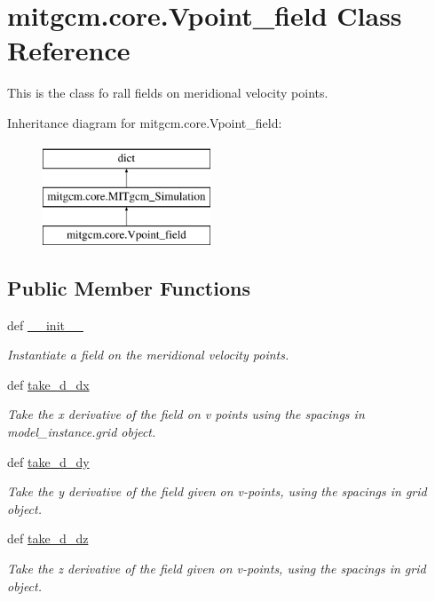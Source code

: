 \hypertarget{classmitgcm_1_1core_1_1Vpoint__field}{\section{mitgcm.\+core.\+Vpoint\+\_\+field Class Reference}
\label{classmitgcm_1_1core_1_1Vpoint__field}
}


This is the class fo rall fields on meridional velocity points.  


Inheritance diagram for mitgcm.\+core.\+Vpoint\+\_\+field\+:\begin{figure}[H]
\begin{center}
\leavevmode
\includegraphics[height=3.000000cm]{classmitgcm_1_1core_1_1Vpoint__field}
\end{center}
\end{figure}
\subsection*{Public Member Functions}
\begin{DoxyCompactItemize}
\item 
def \hyperlink{classmitgcm_1_1core_1_1Vpoint__field_a1ffd906684a51a4045b0b02092fab5ec}{\+\_\+\+\_\+init\+\_\+\+\_\+}
\begin{DoxyCompactList}\small\item\em Instantiate a field on the meridional velocity points. \end{DoxyCompactList}\item 
def \hyperlink{classmitgcm_1_1core_1_1Vpoint__field_a0077d0cdd01de210b130f1e684d61b6d}{take\+\_\+d\+\_\+dx}
\begin{DoxyCompactList}\small\item\em Take the x derivative of the field on v points using the spacings in model\+\_\+instance.\+grid object. \end{DoxyCompactList}\item 
def \hyperlink{classmitgcm_1_1core_1_1Vpoint__field_a7ffa6c1b239c78422f0224d675fd785e}{take\+\_\+d\+\_\+dy}
\begin{DoxyCompactList}\small\item\em Take the y derivative of the field given on v-\/points, using the spacings in grid object. \end{DoxyCompactList}\item 
def \hyperlink{classmitgcm_1_1core_1_1Vpoint__field_a9975d2dcfb23b8cca0986f7e469882fa}{take\+\_\+d\+\_\+dz}
\begin{DoxyCompactList}\small\item\em Take the z derivative of the field given on v-\/points, using the spacings in grid object. \end{DoxyCompactList}\end{DoxyCompactItemize}
